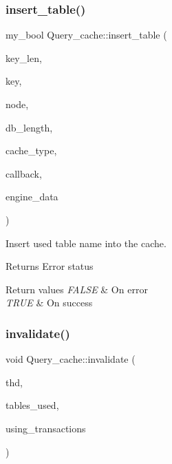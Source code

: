 \subsubsection{\texorpdfstring{insert\+\_\+table()}{insert\_table()}}
{\footnotesize\ttfamily my\+\_\+bool Query\+\_\+cache\+::insert\+\_\+table (\begin{DoxyParamCaption}\item[{size\+\_\+t}]{key\+\_\+len,  }\item[{const char $\ast$}]{key,  }\item[{\mbox{\hyperlink{structQuery__cache__block__table}{Query\+\_\+cache\+\_\+block\+\_\+table}} $\ast$}]{node,  }\item[{size\+\_\+t}]{db\+\_\+length,  }\item[{uint8}]{cache\+\_\+type,  }\item[{qc\+\_\+engine\+\_\+callback}]{callback,  }\item[{ulonglong}]{engine\+\_\+data }\end{DoxyParamCaption})\hspace{0.3cm}{\ttfamily [protected]}}

Insert used table name into the cache.

\begin{DoxyReturn}{Returns}
Error status 
\end{DoxyReturn}

\begin{DoxyRetVals}{Return values}
{\em F\+A\+L\+SE} & On error \\
\hline
{\em T\+R\+UE} & On success \\
\hline
\end{DoxyRetVals}
\mbox{\label{classQuery__cache_ab334e040975e65b11bcb63cee0c85006}} 
\subsubsection{\texorpdfstring{invalidate()}{invalidate()}\hspace{0.1cm}{\footnotesize\ttfamily [1/2]}}
{\footnotesize\ttfamily void Query\+\_\+cache\+::invalidate (\begin{DoxyParamCaption}\item[{T\+HD $\ast$}]{thd,  }\item[{\mbox{\hyperlink{structTABLE__LIST}{T\+A\+B\+L\+E\+\_\+\+L\+I\+ST}} $\ast$}]{tables\+\_\+used,  }\item[{my\+\_\+bool}]{using\+\_\+transactions }\end{DoxyParamCaption})}

